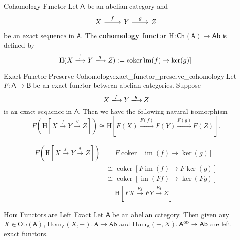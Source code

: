 \begin{definition}{Cohomology Functor}{}
    Let $\mathsf{A}$ be an abelian category and 
    \[
    \begin{tikzcd}[ampersand replacement=\&]
        X \arrow[r, "f"] \& Y \arrow[r, "g"] \& Z
    \end{tikzcd}
    \]
    be an exact sequence in $\mathsf{A}$. The \textbf{cohomology functor} $\mathrm{H}:\mathsf{Ch}_{}\left(\mathsf{A}\right)\to\mathsf{Ab}$ is defined by
    \[
    \mathrm{H}(X\xlongrightarrow{f} Y\xlongrightarrow{g} Z):=\operatorname{coker}[\operatorname{im}(f) \rightarrow \operatorname{ker}(g)].
    \]
\end{definition}


    

\begin{proposition}{Exact Functor Preserve Cohomology}{exact_functor_preserve_cohomology}
    Let $F:\mathsf{A}\to\mathsf{B}$ be an exact functor between abelian categories. Suppose 
    \[
    X \xlongrightarrow{f} Y \xlongrightarrow{g} Z 
    \]
    is an exact sequence in $\mathsf{A}$. Then we have the following natural isomorphism
    \[
    F\left(\mathrm{H}\left[X \xrightarrow{f} Y\xrightarrow{g} Z\right]\right)  \cong \mathrm{H}\left[F(X) \xrightarrow{F(f)} F(Y)\xrightarrow{F(g)} F(Z)\right].
    \]
\end{proposition}

\begin{prf}
    $$
        \begin{aligned}
        F\left(\mathrm{H}\left[X \xrightarrow{f} Y\xrightarrow{g} Z\right]\right)& =F \operatorname{coker}[\operatorname{im}(f) \rightarrow \operatorname{ker}(g)] \\
        & \cong \operatorname{coker}[F \operatorname{im}(f) \rightarrow F \operatorname{ker}(g)] \\
        & \cong \operatorname{coker}[\operatorname{im}(F f) \rightarrow \operatorname{ker}(F g)]\\
        &=\mathrm{H}\left[F X \xrightarrow{F f} F Y \xrightarrow{F g} Z\right]
        \end{aligned}
$$
\end{prf}


\begin{proposition}{Hom Functors are Left Exact}{}
    Let $\mathsf{A}$ be an abelian category. Then given any $X\in \mathrm{Ob}(\mathsf{A})$, $\mathrm{Hom}_{\mathsf{A}}(X,-):\mathsf{A}\to\mathsf{Ab}$ and $\mathrm{Hom}_{\mathsf{A}}(-,X):\mathsf{A}^{\mathrm{op}}\to\mathsf{Ab}$ are left exact functors.
\end{proposition}

